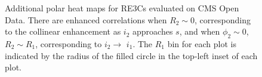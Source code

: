 \begin{figure}[ht!]
    \vspace{-20pt}
    \centering
     \caption[Additional polar heat maps for RE3Cs evaluated on CMS Open Data.]
    {
        Additional polar heat maps for RE3Cs evaluated on CMS Open Data.
        There are enhanced correlations when \(R_2\sim 0\), corresponding to the collinear enhancement
        as \(i_2\) approaches \(s\), and when \(\phi_2 \sim 0\), \(R_2 \sim R_1\), corresponding to \(i_2 \to\) \(i_1\).
        The \(R_1\) bin for each plot is indicated by the radius of the filled circle in the top-left inset of each plot.
    }
    \label{fig:cms_re3cs}
\end{figure}
